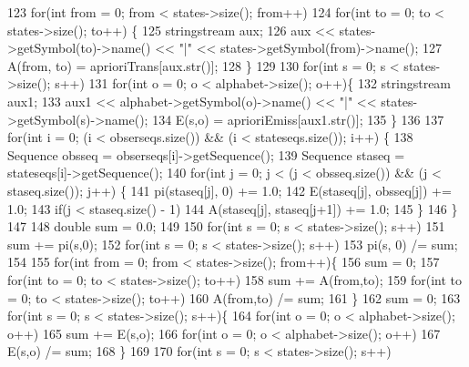 \begin{DoxyCode}
123     \textcolor{keywordflow}{for}(\textcolor{keywordtype}{int} from = 0; from < states->size(); from++) 
124       \textcolor{keywordflow}{for}(\textcolor{keywordtype}{int} to = 0; to < states->size(); to++) \{
125     stringstream aux;
126     aux << states->getSymbol(to)->name() << \textcolor{stringliteral}{"|"} << states->getSymbol(from)->name();
127     A(from, to) = aprioriTrans[aux.str()];
128       \}
129 
130     \textcolor{keywordflow}{for}(\textcolor{keywordtype}{int} s = 0; s < states->size(); s++) 
131       \textcolor{keywordflow}{for}(\textcolor{keywordtype}{int} o = 0; o < alphabet->size(); o++)\{
132     stringstream aux1;
133     aux1 << alphabet->getSymbol(o)->name() << \textcolor{stringliteral}{"|"} << states->getSymbol(s)->name();
134     E(s,o) = aprioriEmiss[aux1.str()];
135       \}
136 
137     \textcolor{keywordflow}{for}(\textcolor{keywordtype}{int} i = 0; (i < obserseqs.size()) && (i < stateseqs.size()); i++) \{
138       Sequence obsseq = obserseqs[i]->getSequence();
139       Sequence staseq = stateseqs[i]->getSequence();
140       \textcolor{keywordflow}{for}(\textcolor{keywordtype}{int} j = 0; j < (j < obsseq.size()) && (j < staseq.size()); j++) \{
141     pi(staseq[j], 0) += 1.0;
142     E(staseq[j], obsseq[j]) += 1.0; 
143     \textcolor{keywordflow}{if}(j < staseq.size() - 1)
144       A(staseq[j], staseq[j+1]) += 1.0;
145       \}
146     \} 
147 
148     \textcolor{keywordtype}{double} sum = 0.0;
149 
150     \textcolor{keywordflow}{for}(\textcolor{keywordtype}{int} s = 0; s < states->size(); s++)
151        sum += pi(s,0);
152     \textcolor{keywordflow}{for}(\textcolor{keywordtype}{int} s = 0; s < states->size(); s++)
153       pi(s, 0) /= sum;
154 
155     \textcolor{keywordflow}{for}(\textcolor{keywordtype}{int} from = 0; from < states->size(); from++)\{
156       sum = 0;
157       \textcolor{keywordflow}{for}(\textcolor{keywordtype}{int} to = 0; to < states->size(); to++)
158     sum += A(from,to);
159       \textcolor{keywordflow}{for}(\textcolor{keywordtype}{int} to = 0; to < states->size(); to++)
160     A(from,to) /= sum;
161     \}
162     sum = 0;
163     \textcolor{keywordflow}{for}(\textcolor{keywordtype}{int} s = 0; s < states->size(); s++)\{
164       \textcolor{keywordflow}{for}(\textcolor{keywordtype}{int} o = 0; o < alphabet->size(); o++)
165     sum += E(s,o);
166       \textcolor{keywordflow}{for}(\textcolor{keywordtype}{int} o = 0; o < alphabet->size(); o++)
167     E(s,o) /= sum;
168     \}
169   
170     \textcolor{keywordflow}{for}(\textcolor{keywordtype}{int} s = 0; s < states->size(); s++)

\end{DoxyCode}
